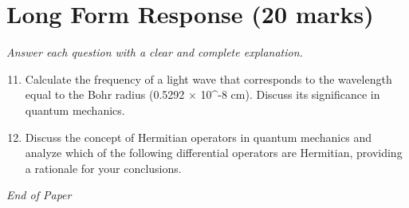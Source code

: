 \documentclass[12pt]{article}
\begin{document}
\section*{Long Form Response (20 marks)}
\textit{Answer each question with a clear and complete explanation.}
\begin{enumerate}[label=\arabic*.]
\setcounter{enumi}{10}
\item Calculate the frequency of a light wave that corresponds to the wavelength equal to the Bohr radius (0.5292 \ensuremath{\times} 10^-8 cm). Discuss its significance in quantum mechanics.
\item Discuss the concept of Hermitian operators in quantum mechanics and analyze which of the following differential operators are Hermitian, providing a rationale for your conclusions.
\end{enumerate}

\vfill
\noindent\textit{End of Paper}
\end{document}

